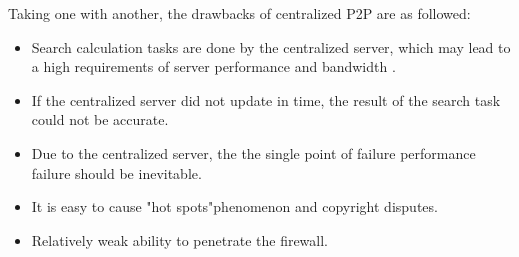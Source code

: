 {Taking one with another, the drawbacks of centralized P2P are as followed:
\begin{itemize}
\item Search calculation tasks are done by the centralized server, which may lead to a high requirements of server performance and bandwidth .
\item If the centralized server did not update in time, the result of the search task could not be accurate.
\item Due to the centralized server, the the single point of failure performance failure should be inevitable.
\item It is easy to cause "hot spots"phenomenon and copyright disputes.
\item Relatively weak ability to penetrate the firewall.
\end{itemize}

}

